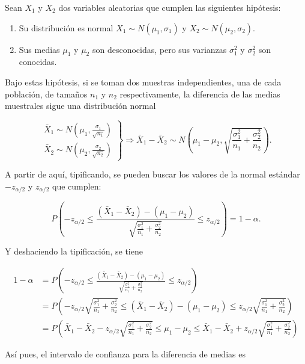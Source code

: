 \documentclass[
  a4paper,
]{scrreport}
\providecommand{\tightlist}{%
  \setlength{\itemsep}{0pt}\setlength{\parskip}{0pt}}\usepackage{longtable,booktabs,array}
\theoremstyle{plain}
\theoremstyle{definition}
\theoremstyle{definition}
\theoremstyle{remark}
\begin{document}
Sean \(X_1\) y \(X_2\) dos variables aleatorias que cumplen las
siguientes hipótesis:

\begin{enumerate}
\def\labelenumi{\arabic{enumi}.}
\tightlist
\item
  Su distribución es normal \(X_1\sim N(\mu_1,\sigma_1)\) y
  \(X_2\sim N(\mu_2,\sigma_2)\).
\item
  Sus medias \(\mu_1\) y \(\mu_2\) son desconocidas, pero sus varianzas
  \(\sigma^2_1\) y \(\sigma^2_2\) son conocidas.
\end{enumerate}

Bajo estas hipótesis, si se toman dos muestras independientes, una de
cada población, de tamaños \(n_1\) y \(n_2\) respectivamente, la
diferencia de las medias muestrales sigue una distribución normal

\[
\left.
\begin{array}{l}
\bar{X}_1\sim N\left(\mu_1,\frac{\sigma_1}{\sqrt{n_1}} \right)\\
\bar{X}_2\sim N\left(\mu_2,\frac{\sigma_2}{\sqrt{n_2}} \right)
\end{array}
\right\}
\Rightarrow
\bar{X}_1-\bar{X}_2 \sim N\left(\mu_1-\mu_2,\sqrt{\frac{\sigma^2_1}{n_1}+\frac{\sigma^2_2}{n_2}}\right).
\]

A partir de aquí, tipificando, se pueden buscar los valores de la normal
estándar \(-z_{\alpha/2}\) y \(z_{\alpha/2}\) que cumplen:

\[
P\left(-z_{\alpha/2}\leq \frac{(\bar{X}_1-\bar{X}_2)-(\mu_1-\mu_2)}{\sqrt{\frac{\sigma^2_1}{n_1}+\frac{\sigma^2_2}{n_2}}} \leq z_{\alpha/2}\right) = 1-\alpha.
\]

Y deshaciendo la tipificación, se tiene

\begin{align*}
1-\alpha 
&= P\left(-z_{\alpha/2}\leq \frac{(\bar{X}_1-\bar{X}_2)-(\mu_1-\mu_2)}{\sqrt{\frac{\sigma^2_1}{n_1}+\frac{\sigma^2_2}{n_2}}} \leq z_{\alpha/2}\right) \\
&= P\left(-z_{\alpha/2}\sqrt{\frac{\sigma^2_1}{n_1}+\frac{\sigma^2_2}{n_2}}\leq (\bar{X}_1-\bar{X}_2)-(\mu_1-\mu_2)\leq z_{\alpha/2}\sqrt{\frac{\sigma^2_1}{n_1}+\frac{\sigma^2_2}{n_2}}\right) \\
&= P\left(\bar{X}_1-\bar{X}_2 - z_{\alpha/2}\sqrt{\frac{\sigma^2_1}{n_1}+\frac{\sigma^2_2}{n_2}}\leq \mu_1-\mu_2\leq \bar{X}_1-\bar{X}_2 + z_{\alpha/2}\sqrt{\frac{\sigma^2_1}{n_1}+\frac{\sigma^2_2}{n_2}}\right)
\end{align*}

Así pues, el intervalo de confianza para la diferencia de medias es
\end{document}
